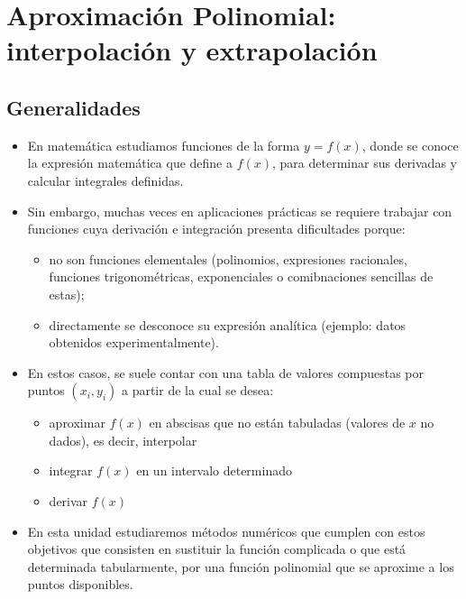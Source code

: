 \documentclass[]{book}
\providecommand{\tightlist}{%
  \setlength{\itemsep}{0pt}\setlength{\parskip}{0pt}}
\begin{document}
\hypertarget{aproximaciuxf3n-polinomial-interpolaciuxf3n-y-extrapolaciuxf3n}{%
\chapter{Aproximación Polinomial: interpolación y extrapolación}\label{aproximaciuxf3n-polinomial-interpolaciuxf3n-y-extrapolaciuxf3n}}

\hypertarget{generalidades-2}{%
\section{Generalidades}\label{generalidades-2}}

\begin{itemize}
\item
  En matemática estudiamos funciones de la forma \(y = f(x)\), donde se conoce la expresión matemática que define a \(f(x)\), para determinar sus derivadas y calcular integrales definidas.
\item
  Sin embargo, muchas veces en aplicaciones prácticas se requiere trabajar con funciones cuya derivación e integración presenta dificultades porque:

  \begin{itemize}
  \tightlist
  \item
    no son funciones elementales (polinomios, expresiones racionales, funciones trigonométricas, exponenciales o comibnaciones sencillas de estas);
  \item
    directamente se desconoce su expresión analítica (ejemplo: datos obtenidos experimentalmente).
  \end{itemize}
\item
  En estos casos, se suele contar con una tabla de valores compuestas por puntos \((x_i, y_i)\) a partir de la cual se desea:

  \begin{itemize}
  \tightlist
  \item
    aproximar \(f(x)\) en abscisas que no están tabuladas (valores de \(x\) no dados), es decir, interpolar
  \item
    integrar \(f(x)\) en un intervalo determinado
  \item
    derivar \(f(x)\)
  \end{itemize}
\item
  En esta unidad estudiaremos métodos numéricos que cumplen con estos objetivos que consisten en sustituir la función complicada o que está determinada tabularmente, por una función polinomial que se aproxime a los puntos disponibles.
\end{itemize}
\end{document}
